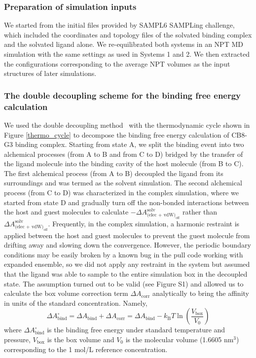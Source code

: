 \documentclass[journal=jacsat,manuscript=article]{achemso}
\begin{document}
\subsubsection{Preparation of simulation inputs}
We started from the initial files provided by SAMPL6 SAMPLing challenge, which included the coordinates and topology files of the solvated binding complex and the solvated ligand alone. We re-equilibrated both systems in an NPT MD simulation with the same settings as used in Systems 1 and 2. We then extracted the configurations corresponding to the average NPT volumes as the input structures of later simulations.  

\subsubsection{The double decoupling scheme for the binding free energy calculation}
We used the double decoupling method~\cite{gilson1997statistical} with the thermodynamic cycle shown in Figure \ref{thermo_cycle} to decompose the binding free energy calculation of CB8-G3 binding complex. Starting from state A, we split the binding event into two alchemical processes (from A to B and from C to D) bridged by the transfer of the ligand molecule into the binding cavity of the host molecule (from B to C). The first alchemical process (from A to B) decoupled the ligand from its surroundings and was termed as the solvent simulation. The second alchemical process (from C to D) was characterized in the complex simulation, where we started from state D and gradually turn off the non-bonded interactions between the host and guest molecules to calculate $-\Delta A^{\text{solv}}_{\text{(elec + vdW)}_{\text{off}}}$ rather than $\Delta A^{\text{solv}}_{\text{(elec + vdW)}_{\text{off}}}$. Frequently, in the complex simulation, a harmonic restraint is applied between the host and guest molecules to prevent the guest molecule from drifting away and slowing down the convergence. However, the periodic boundary conditions may be easily broken by a known bug in the pull code working with expanded ensemble, so we did not apply any restraint in the system but assumed that the ligand was able to sample to the entire simulation box in the decoupled state. The assumption turned out to be valid (see Figure S1) and allowed us to calculate the box volume correction term $\Delta A_{\text{corr}}$ analytically to bring the affinity in units of the standard concentration. Namely, 
\begin{equation}
    \Delta A^{\circ}_{\text{bind}} = \Delta A_{\text{bind}} + \Delta A_{\text{corr}} = \Delta A_{\text{bind}} - k_{\text{B}}T \ln \left(\frac{V_{\text{box}}}{V_{0}}\right)
\end{equation} where $\Delta A^{\circ}_{\text{bind}}$ is the binding free energy under standard temperature and pressure, $V_{\text{box}}$ is the box volume and $V_0$ is the molecular volume (1.6605 nm$^3$) corresponding to the 1 mol/L reference concentration. 
\end{document}
